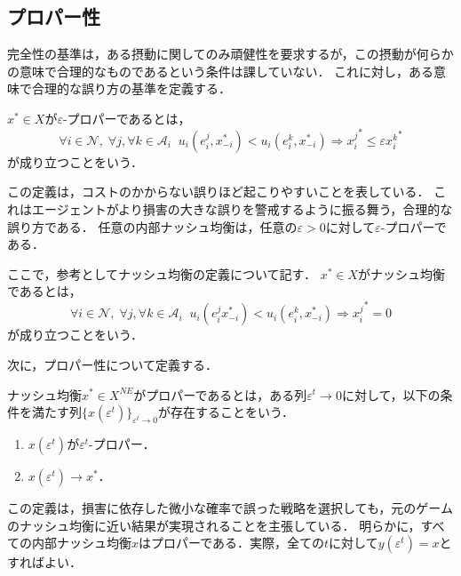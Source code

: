 \documentclass{jsreport}
\begin{document}
\subsection{プロパー性}
完全性の基準は，ある摂動に関してのみ頑健性を要求するが，この摂動が何らかの意味で合理的なものであるという条件は課していない．
これに対し，ある意味で合理的な誤り方の基準を定義する．
\begin{screen}
  \begin{defi}
    $x^{*} \in X$が$\varepsilon$-プロパーであるとは，
    \begin{equation}
      \forall i \in \mathcal{N}, \; \forall j, \forall k \in \mathcal{A}_i \; \; u_i(e_i^j, x_{-i}^{*}) < u_i(e_i^k, x_{-i}^{*}) \Rightarrow {x_i^{j}}^{*} \leq \varepsilon {x_i^k}^{*} \nonumber
    \end{equation}
    が成り立つことをいう．
  \end{defi}
\end{screen}

この定義は，コストのかからない誤りほど起こりやすいことを表している．
これはエージェントがより損害の大きな誤りを警戒するように振る舞う，合理的な誤り方である．
任意の内部ナッシュ均衡は，任意の$\varepsilon > 0$に対して$\varepsilon$-プロパーである．

ここで，参考としてナッシュ均衡の定義について記す．
$x^{*} \in X$がナッシュ均衡であるとは，
\begin{equation}
  \forall i \in \mathcal{N}, \; \forall j, \forall k \in \mathcal{A}_i \; \; u_i(e_i^j x_{-i}^{*}) < u_i(e_i^k, x_{-i}^{*}) \Rightarrow {x_i^j}^{*} = 0 \nonumber
\end{equation}
が成り立つことをいう．

次に，プロパー性について定義する．
\begin{screen}
  \begin{defi}
    ナッシュ均衡$x^{*} \in X^{NE}$がプロパーであるとは，ある列$\varepsilon^t \to 0$に対して，以下の条件を満たす列$\{x(\varepsilon^t)\}_{\varepsilon^t \to 0}$が存在することをいう．
    \begin{enumerate}
      \item $x(\varepsilon^t)$が$\varepsilon^t$-プロパー．
      \item $x(\varepsilon^t) \to x^{*}$．
    \end{enumerate}
  \end{defi}
\end{screen}

この定義は，損害に依存した微小な確率で誤った戦略を選択しても，元のゲームのナッシュ均衡に近い結果が実現されることを主張している．
明らかに，すべての内部ナッシュ均衡$x$はプロパーである．実際，全ての$t$に対して$y(\varepsilon^t) = x$とすればよい．
\end{document}
